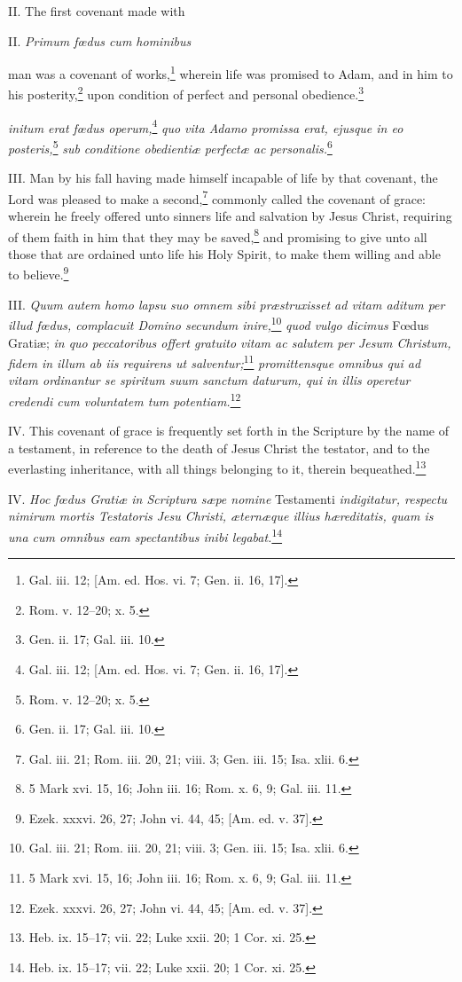 II. The first covenant made with

II. \emph{Primum fœdus cum hominibus }

man was a covenant of works,\footnote{Gal. iii. 12; [Am. ed. Hos. vi. 7; Gen. ii. 16, 17].} wherein life was promised to Adam, and in him to his posterity,\footnote{Rom. v. 12–20; x. 5.} upon condition of perfect and personal obedience.\footnote{Gen. ii. 17; Gal. iii. 10.}

\emph{initum erat fœdus operum,}\footnote{Gal. iii. 12; [Am. ed. Hos. vi. 7; Gen. ii. 16, 17].}\emph{ quo vita Adamo promissa erat, ejusque in eo posteris,}\footnote{Rom. v. 12–20; x. 5.}\emph{ sub conditione obedientiæ perfectæ ac personalis.}\footnote{Gen. ii. 17; Gal. iii. 10.}

III. Man by his fall having made himself incapable of life by that covenant, the Lord was pleased to make a second,\footnote{Gal. iii. 21; Rom. iii. 20, 21; viii. 3; Gen. iii. 15; Isa. xlii. 6.} commonly called the covenant of grace: wherein he freely offered unto sinners life and salvation by Jesus Christ, requiring of them faith in him that they may be saved,\footnote{5 Mark xvi. 15, 16; John iii. 16; Rom. x. 6, 9; Gal. iii. 11.} and promising to give unto all those that are ordained unto life his Holy Spirit, to make them willing and able to believe.\footnote{Ezek. xxxvi. 26, 27; John vi. 44, 45; [Am. ed. v. 37].}

III. \emph{Quum autem homo lapsu suo omnem sibi præstruxisset ad vitam aditum per illud fœdus, complacuit Domino secundum inire,}\footnote{Gal. iii. 21; Rom. iii. 20, 21; viii. 3; Gen. iii. 15; Isa. xlii. 6.}\emph{ quod vulgo dicimus }Fœdus Gratiæ; \emph{in quo peccatoribus offert gratuito vitam ac salutem per Jesum Christum, fidem in illum ab iis requirens ut salventur;}\footnote{5 Mark xvi. 15, 16; John iii. 16; Rom. x. 6, 9; Gal. iii. 11.}\emph{ promittensque omnibus qui ad vitam ordinantur se spiritum suum sanctum daturum, qui in illis operetur credendi cum voluntatem tum potentiam.}\footnote{Ezek. xxxvi. 26, 27; John vi. 44, 45; [Am. ed. v. 37].}

IV. This covenant of grace is frequently set forth in the Scripture by the name of a testament, in reference to the death of Jesus Christ the testator, and to the everlasting inheritance, with all things belonging to it, therein bequeathed.\footnote{Heb. ix. 15–17; vii. 22; Luke xxii. 20; 1 Cor. xi. 25.}

IV. \emph{Hoc fœdus Gratiæ in Scriptura sæpe nomine} Testamenti \emph{indigitatur, respectu nimirum mortis Testatoris Jesu Christi, æternæque illius hæreditatis, quam is una cum omnibus eam spectantibus inibi legabat.}\footnote{Heb. ix. 15–17; vii. 22; Luke xxii. 20; 1 Cor. xi. 25.}

